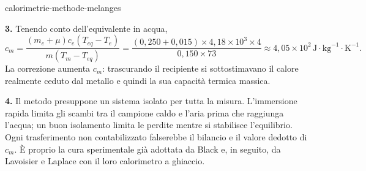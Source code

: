 \begin{exo}{calorimetrie-methode-melanges}
\begin{solution}
\textbf{3.} Tenendo conto dell'equivalente in acqua,
\[
c_m=\frac{(m_e+\mu)c_e(T_{eq}-T_e)}{m(T_m-T_{eq})}
=\frac{(0{,}250+0{,}015)\times4{,}18\times10^3\times4}{0{,}150\times73}
\approx4{,}05\times10^2\,\text{J}\!\cdot\!\text{kg}^{-1}\!\cdot\!\text{K}^{-1}.
\]
La correzione aumenta $c_m$: trascurando il recipiente si sottostimavano il calore realmente ceduto dal metallo e quindi la sua capacità termica massica.

\textbf{4.} Il metodo presuppone un sistema isolato per tutta la misura. L'immersione rapida limita gli scambi tra il campione caldo e l'aria prima che raggiunga l'acqua; un buon isolamento limita le perdite mentre si stabilisce l'equilibrio. Ogni trasferimento non contabilizzato falserebbe il bilancio e il valore dedotto di $c_m$. È proprio la cura sperimentale già adottata da Black e, in seguito, da Lavoisier e Laplace con il loro calorimetro a ghiaccio.
\end{solution}
\end{exo}

